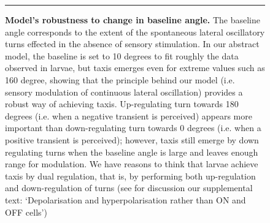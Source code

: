 \begin{figure}
\begin{center}
\caption{{\bf Model’s robustness to change in baseline angle.}
The baseline angle corresponds to the extent of the spontaneous lateral oscillatory turns effected in the absence of sensory stimulation. In our abstract model, the baseline is set to 10 degrees to fit roughly the data observed in larvae, but taxis emerges even for extreme values such as 160 degree, showing that the principle behind our model (i.e. sensory modulation of continuous lateral oscillation) provides a robust way of achieving taxis. Up-regulating turn towards 180 degrees (i.e. when a negative transient is perceived) appears more important than down-regulating turn towards 0 degrees (i.e. when a positive transient is perceived); however, taxis still emerge by down regulating turns when the baseline angle is large and leaves enough range for modulation. We have reasons to think that larvae achieve taxis by dual regulation, that is, by performing both up-regulation and down-regulation of turns (see for discussion our supplemental text: ‘Depolarisation and hyperpolarisation rather than ON and OFF cells’)   
\label{fig:FigS3}}
\end{center}
\hrule
\end{figure}
%

